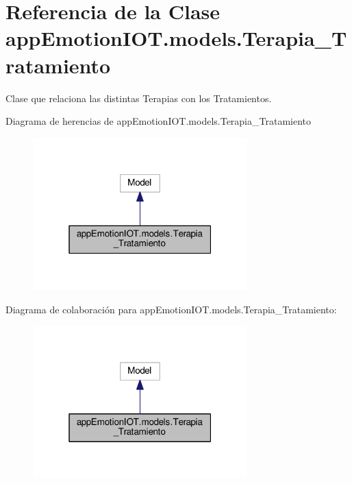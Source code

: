 \hypertarget{classappEmotionIOT_1_1models_1_1Terapia__Tratamiento}{}\section{Referencia de la Clase app\+Emotion\+I\+O\+T.\+models.\+Terapia\+\_\+\+Tratamiento}
\label{classappEmotionIOT_1_1models_1_1Terapia__Tratamiento}


Clase que relaciona las distintas Terapias con los Tratamientos.  




Diagrama de herencias de app\+Emotion\+I\+O\+T.\+models.\+Terapia\+\_\+\+Tratamiento
\nopagebreak
\begin{figure}[H]
\begin{center}
\leavevmode
\includegraphics[width=235pt]{classappEmotionIOT_1_1models_1_1Terapia__Tratamiento__inherit__graph}
\end{center}
\end{figure}


Diagrama de colaboración para app\+Emotion\+I\+O\+T.\+models.\+Terapia\+\_\+\+Tratamiento\+:
\nopagebreak
\begin{figure}[H]
\begin{center}
\leavevmode
\includegraphics[width=235pt]{classappEmotionIOT_1_1models_1_1Terapia__Tratamiento__coll__graph}
\end{center}
\end{figure}
